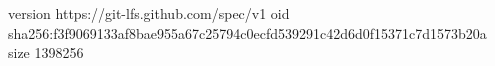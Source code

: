 version https://git-lfs.github.com/spec/v1
oid sha256:f3f9069133af8bae955a67c25794c0ecfd539291c42d6d0f15371c7d1573b20a
size 1398256
